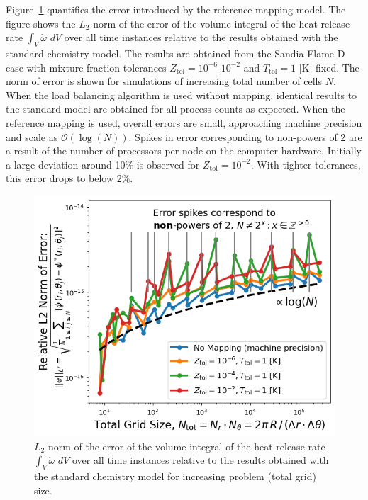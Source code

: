 \documentclass[letterpaper,twocolumn,10pt]{article}
\begin{document}
Figure~\ref{fig:Error} quantifies the error introduced by the reference mapping model. The figure shows the $L_2$ norm of the error of the volume integral of the heat release rate $\int_V \dot{\omega} \,\, dV$ over all time instances relative to the results obtained with the standard chemistry model. The results are obtained from the Sandia Flame D case with mixture fraction tolerances $Z_\mathrm{tol} = 10^{-6}$-$10^{-2}$ and $T_\mathrm{tol} = 1$ [K] fixed. The norm of error is shown for simulations of increasing total number of cells $N$. When the load balancing algorithm is used without mapping, identical results to the standard model are obtained for all process counts as expected. When the reference mapping is used, overall errors are small, approaching machine precision and scale as $\mathcal{O}(\log(N))$. Spikes in error corresponding to non-powers of 2 are a result of the number of processors per node on the computer hardware. Initially a large deviation around 10\% is observed for $Z_\mathrm{tol} = 10^{-2}$. With tighter tolerances, this error drops to below 2\%.

\begin{figure}[h!]
    \centering
    \includegraphics[width=1.03\linewidth]{Figures/Ref_Error.PNG}
    \caption{$L_2$ norm of the error of the volume integral of the heat release rate $\int_V \dot{\omega} \,\, dV$ over all time instances relative to the results obtained with the standard chemistry model for increasing problem (total grid) size.}
    \label{fig:Error}
\end{figure}
\end{document}
